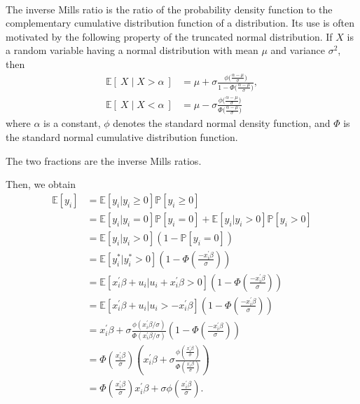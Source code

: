 \begin{note}
    \

    The inverse Mills ratio is the ratio of the 
    probability density function to the complementary 
    cumulative distribution function of a distribution. 
    Its use is often motivated by the following property 
    of the truncated normal distribution. 
    If $X$ is a random variable having a normal distribution 
    with mean $\mu$ and variance $\sigma^2$, then
    \begin{align*}
        \mathbb{E}[\:X\mid X>\alpha\:]&=\mu+\sigma\frac{\phi\Big(\frac{\alpha-\mu}\sigma\Big)}{1-\Phi\Big(\frac{\alpha-\mu}\sigma\Big)},\\
        \mathbb{E}[\:X\mid X<\alpha\:]&=\mu-\sigma\frac{\phi\Big(\frac{\alpha-\mu}\sigma\Big)}{\Phi\Big(\frac{\alpha-\mu}\sigma\Big)}
    \end{align*}
    where $\alpha$ is a constant, 
    $\phi$ denotes the standard normal density function, 
    and $\Phi$ is the standard normal cumulative distribution function.

    The two fractions are the inverse Mills ratios.
\end{note}

Then, we obtain
\begin{align*}
    \mathbb{E}[y_i] &= \mathbb{E}[y_i|y_i \geq 0] \mathbb{P}[y_i \geq 0] \\
    &= \mathbb{E}[y_i|y_i = 0]\mathbb{P}[y_i = 0] + \mathbb{E}[y_i|y_i > 0]\mathbb{P}[y_i > 0]\\
    &= \mathbb{E}[y_i|y_i > 0](1-\mathbb{P}[y_i = 0])\\
    &= \mathbb{E}[y_i^*|y_i^*>0]\left(1-\Phi\left(\frac{-x_i^{\prime} \beta}{\sigma}\right)\right)\\
    &= \mathbb{E}[x_i^{\prime} \beta + u_i|u_i +x_i^{\prime} \beta>0]\left(1-\Phi\left(\frac{-x_i^{\prime} \beta}{\sigma}\right)\right)\\
    &= \mathbb{E}[x_i^{\prime} \beta + u_i|u_i > -x_i^{\prime} \beta]\left(1-\Phi\left(\frac{-x_i^{\prime} \beta}{\sigma}\right)\right)\\
    &= x_i^{\prime} \beta + \sigma \frac{\phi(x_i^{\prime} \beta/\sigma)}{\Phi(x_i^{\prime} \beta/\sigma)}\left(1-\Phi\left(\frac{-x_i^{\prime} \beta}{\sigma}\right)\right)\\
    &= \Phi\left(\frac{x_i^{\prime} \beta}{\sigma}\right)\left(x_i^{\prime} \beta +\sigma \frac{\phi\left(\frac{x_i^{\prime} \beta}{\sigma}\right)}{\Phi\left(\frac{x_i^{\prime} \beta}{\sigma}\right)}\right)\\
    &= \Phi \left(\frac{x_i^{\prime} \beta}{\sigma}\right) x_i^{\prime} \beta +\sigma \phi\left(\frac{x_i^{\prime} \beta}{\sigma}\right).
\end{align*}

